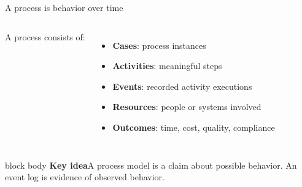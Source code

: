 \documentclass[aspectratio=169,11pt]{beamer}
\newcommand{\keyidea}[1]{%
  \begin{beamercolorbox}[rounded=true,sep=0.65em]{block body}
    \textbf{\color{Teal}Key idea}\quad #1
  \end{beamercolorbox}
}
\begin{document}
\begin{frame}{A process is behavior over time}
  \begin{columns}[T,onlytextwidth]
      A process consists of:
      \begin{itemize}
        \item \textbf{Cases}: process instances
        \item \textbf{Activities}: meaningful steps
        \item \textbf{Events}: recorded activity executions
        \item \textbf{Resources}: people or systems involved
        \item \textbf{Outcomes}: time, cost, quality, compliance
      \end{itemize}
      \centering
  \end{columns}
  \vspace{0.35cm}
  \keyidea{A process model is a claim about possible behavior. An event log is
  evidence of observed behavior.}
\end{frame}
\end{document}
